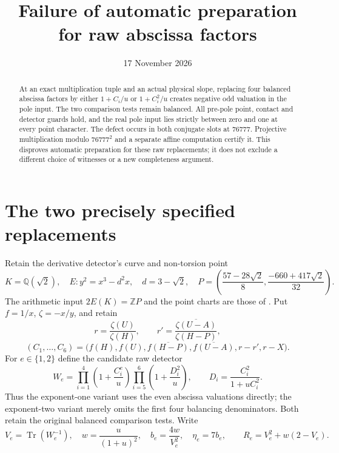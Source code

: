 \documentclass[11pt,a4paper]{article}
\title{Failure of automatic preparation for raw abscissa factors}
\author{}\date{17 November 2026}
\newcommand{\Q}{\mathbb Q}\DeclareMathOperator{\Tr}{Tr}
\begin{document}
\maketitle
\begin{abstract}
At an exact multiplication tuple and an actual physical slope, replacing
four balanced abscissa factors by either $1+C_i/u$ or $1+C_i^2/u$
creates negative odd valuation in the pole input. The two comparison
tests remain balanced. All pre-pole point, contact and detector guards
hold, and the real pole input lies strictly between zero and one at
every point character. The defect occurs in both conjugate slots at
$76777$. Projective multiplication modulo $76777^2$ and a separate
affine computation certify it. This disproves automatic preparation
for these raw replacements; it does not exclude a different choice
of witnesses or a new completeness argument.
\end{abstract}

\section*{The two precisely specified replacements}
Retain the derivative detector's curve and non-torsion point
\[
 K=\Q(\sqrt2),\quad E:y^2=x^3-d^2x,\quad d=3-\sqrt2,
 \quad P=\left(\frac{57-28\sqrt2}{8},\frac{-660+417\sqrt2}{32}\right).
\]
The arithmetic input $2E(K)=\mathbb ZP$ and the point charts are those
of \cite{Derivative,FullAux}. Put $f=1/x$, $\zeta=-x/y$, and retain
\[
 r=\frac{\zeta(U)}{\zeta(H)},\qquad
 r'=\overline{\frac{\zeta(U-A)}{\zeta(H-P)}},
\]
\[
 (C_1,\ldots,C_6)
 =\bigl(f(H),f(U),\overline{f(H-P)},\overline{f(U-A)},r-r',r-X\bigr).
\]
For $e\in\{1,2\}$ define the candidate raw detector
\begin{equation}\label{eq:raw}
 W_e=\prod_{i=1}^4\left(1+\frac{C_i^e}{u}\right)
          \prod_{i=5}^6\left(1+\frac{D_i^2}{u}\right),
 \qquad D_i=\frac{C_i^2}{1+uC_i^2}.
\end{equation}
Thus the exponent-one variant uses the even abscissa valuations directly;
the exponent-two variant merely omits the first four balancing denominators.
Both retain the original balanced comparison tests. Write
\[
 V_e=\Tr(W_e^{-1}),\quad w=\frac{u}{(1+u)^2},\quad
 b_e=\frac{4w}{V_e^2},\quad\eta_e=7b_e,
 \qquad R_e=V_e^2+w(2-V_e).
\]
\end{document}

